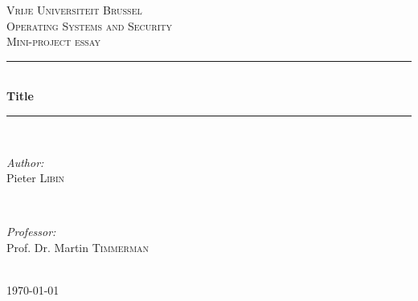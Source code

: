 \documentclass[12pt]{report}
\begin{document}

\begin{titlepage}

\newcommand{\HRule}{\rule{\linewidth}{0.5mm}} %

\center %

\textsc{\LARGE Vrije Universiteit Brussel}\\[1.5cm] 
\textsc{\Large Operating Systems and Security}\\[0.5cm] 
\textsc{\large Mini-project essay}\\[0.5cm] 

\HRule \\[0.4cm]
{ \huge \bfseries Title}\\[0.4cm] %
\HRule \\[1.5cm]

\begin{minipage}{0.4\textwidth}
\begin{flushleft} \large
\emph{Author:}\\
Pieter \textsc{Libin} %
\end{flushleft}
\end{minipage}
~
\begin{minipage}{0.4\textwidth}
\begin{flushright} \large
\emph{Professor:} \\
Prof. Dr. Martin \textsc{Timmerman} 
\end{flushright}
\end{minipage}\\[4cm]

{\large \today}\\[3cm] %


\vfill %

\end{titlepage}

\end{document}
